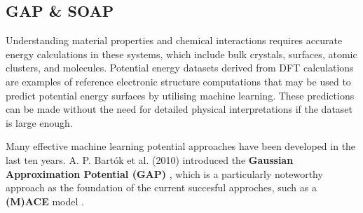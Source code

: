 \subsection{GAP \& SOAP} \label{subsec:2.4.2}
Understanding material properties and chemical interactions requires accurate energy calculations in these systems, which include bulk crystals, surfaces, atomic clusters, and molecules.
Potential energy datasets derived from DFT calculations are examples of reference electronic structure computations that may be used to predict potential energy surfaces by utilising machine learning. These predictions can be made without the need for detailed physical interpretations \cite{Bartk2010} if the dataset is large enough.

Many effective machine learning potential approaches have been developed in the last ten years. 
A. P. Bartók et al. (2010) introduced the \textbf{Gaussian Approximation Potential (GAP)} \cite{Bartk2010, Bartk2015}, which is a particularly noteworthy approach as the foundation of the current succesful approches, such as a \textbf{(M)ACE} model \cite{Drautz2019, Dusson2022, Witt2023, Batatia2025}.

